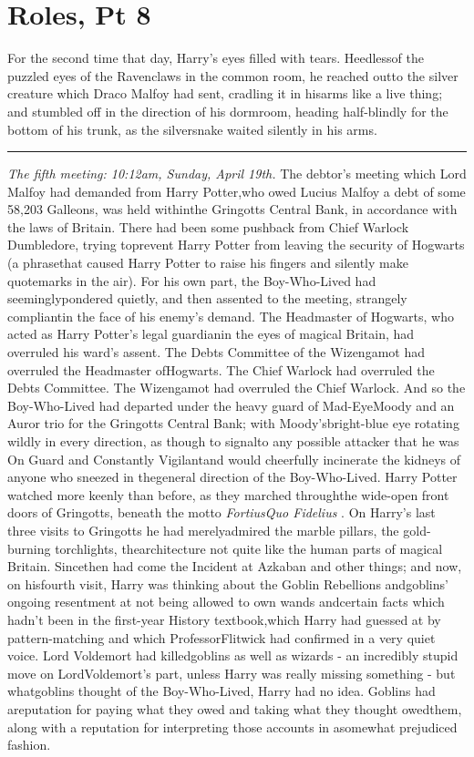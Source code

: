 \chapter{Roles, Pt 8}
For the second time that day, Harry's eyes filled with tears. Heedlessof the puzzled eyes of the Ravenclaws in the common room, he reached outto the silver creature which Draco Malfoy had sent, cradling it in hisarms like a live thing; and stumbled off in the direction of his dormroom, heading half-blindly for the bottom of his trunk, as the silversnake waited silently in his arms.

\begin{center}\rule{3in}{0.4pt}\end{center}

\emph{The fifth meeting: 10:12am, Sunday, April 19th.}
The debtor's meeting which Lord Malfoy had demanded from Harry Potter,who owed Lucius Malfoy a debt of some 58,203 Galleons, was held withinthe Gringotts Central Bank, in accordance with the laws of Britain.
There had been some pushback from Chief Warlock Dumbledore, trying toprevent Harry Potter from leaving the security of Hogwarts (a phrasethat caused Harry Potter to raise his fingers and silently make quotemarks in the air). For his own part, the Boy-Who-Lived had seeminglypondered quietly, and then assented to the meeting, strangely compliantin the face of his enemy's demand.
The Headmaster of Hogwarts, who acted as Harry Potter's legal guardianin the eyes of magical Britain, had overruled his ward's assent.
The Debts Committee of the Wizengamot had overruled the Headmaster ofHogwarts.
The Chief Warlock had overruled the Debts Committee.
The Wizengamot had overruled the Chief Warlock.
And so the Boy-Who-Lived had departed under the heavy guard of Mad-EyeMoody and an Auror trio for the Gringotts Central Bank; with Moody'sbright-blue eye rotating wildly in every direction, as though to signalto any possible attacker that he was On Guard and Constantly Vigilantand would cheerfully incinerate the kidneys of anyone who sneezed in thegeneral direction of the Boy-Who-Lived.
Harry Potter watched more keenly than before, as they marched throughthe wide-open front doors of Gringotts, beneath the motto \emph{FortiusQuo Fidelius} . On Harry's last three visits to Gringotts he had merelyadmired the marble pillars, the gold-burning torchlights, thearchitecture not quite like the human parts of magical Britain. Sincethen had come the Incident at Azkaban and other things; and now, on hisfourth visit, Harry was thinking about the Goblin Rebellions andgoblins' ongoing resentment at not being allowed to own wands andcertain facts which hadn't been in the first-year History textbook,which Harry had guessed at by pattern-matching and which ProfessorFlitwick had confirmed in a very quiet voice. Lord Voldemort had killedgoblins as well as wizards - an incredibly stupid move on LordVoldemort's part, unless Harry was really missing something - but whatgoblins thought of the Boy-Who-Lived, Harry had no idea. Goblins had areputation for paying what they owed and taking what they thought owedthem, along with a reputation for interpreting those accounts in asomewhat prejudiced fashion.
